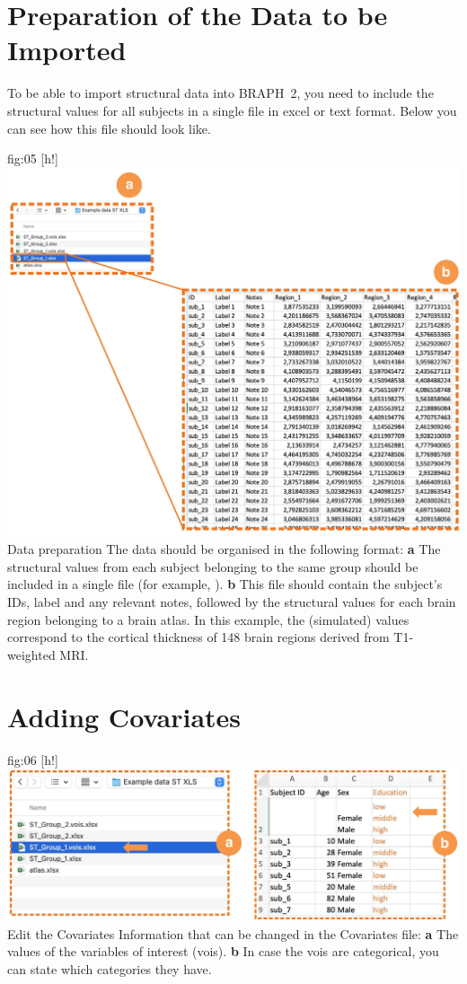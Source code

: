 \documentclass[justified]{tufte-handout}
\begin{document}

\clearpage
\section{Preparation of the Data to be Imported}

To be able to import structural data into BRAPH~2, you need to include the structural values for all subjects in a single file in excel or text format. Below you can see how this file should look like.

	{fig:05}
	{
	[h!]
	\includegraphics{fig05.jpg}
	}
	{Data preparation}
	{
	The data should be organised in the following format:
	{\bf a} The structural values from each subject belonging to the same group should be included in a single file (for example, ). 
	{\bf b} This file should contain the subject's IDs, label and any relevant notes, followed by the structural values for each brain region belonging to a brain atlas. In this example, the (simulated) values correspond to the cortical thickness of 148 brain regions derived from T1-weighted MRI.
	} 


\section{Adding Covariates}

	{fig:06}
	{
	[h!]
	\includegraphics{fig06.jpg}
	}
	{Edit the Covariates}
	{
	Information that can be changed in the Covariates file: 
	{\bf a} The values of the variables of interest (vois).
	{\bf b} In case the vois are categorical, you can state which categories they have.
	}
	
\end{document}
